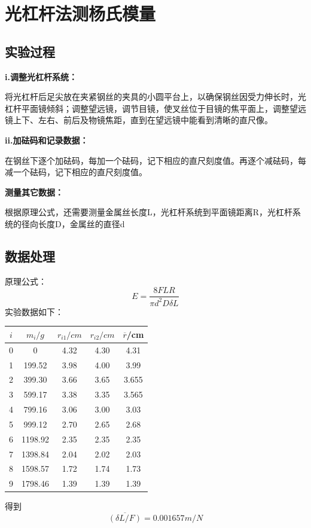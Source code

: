 \documentclass[a4paper, 10pt]{article}
\begin{document}
\section{光杠杆法测杨氏模量}
\subsection{实验过程}

\noindent \textbf{i.‌调整光杠杆系统‌：}

\noindent 将光杠杆后足尖放在夹紧钢丝的夹具的小圆平台上，以确保钢丝因受力伸长时，光杠杆平面镜倾斜；调整望远镜，调节目镜，使叉丝位于目镜的焦平面上，调整望远镜上下、左右、前后及物镜焦距，直到在望远镜中能看到清晰的直尺像。

\vspace{10pt}
\noindent \textbf{ii.‌加砝码和记录数据‌：}

\noindent 在钢丝下逐个加砝码，每加一个砝码，记下相应的直尺刻度值。再逐个减砝码，每减一个砝码，记下相应的直尺刻度值。

\vspace{10pt}
\noindent \textbf{测量其它数据：}

\noindent 根据原理公式，还需要测量金属丝长度L，光杠杆系统到平面镜距离R，光杠杆系统的径向长度D，金属丝的直径d

\subsection{数据处理}
\noindent 原理公式：
$$E=\frac{8FLR}{\pi d^2D \delta L}$$
实验数据如下：
\begin{center}
    \begin{tabular}{|c|c|c|c|c|}
      \hline
      $i $& $m_i/g$ & $r_{i1}/cm$ & $r_{i2}/cm$ & $\overline{r}$/cm\\
      \hline
      0 &0 &4.32&4.30&4.31\\
      \hline
      1 & 199.52&3.98&4.00&3.99\\
      \hline
      2 &399.30 &3.66&3.65&3.655\\
      \hline
      3 & 599.17&3.38&3.35&3.565\\
      \hline
      4 &799.16 &3.06&3.00&3.03\\
      \hline
      5 &999.12 &2.70&2.65&2.68\\
      \hline
      6 &1198.92 &2.35&2.35&2.35\\
      \hline
      7 & 1398.84&2.04&2.02&2.03\\
      \hline
      8 &1598.57 &1.72&1.74&1.73\\
      \hline
      9 & 1798.46&1.39&1.39&1.39\\
      \hline
    \end{tabular}
  \end{center}
  \noindent 得到
  $$\overline{(\delta L/F)}=0.001657m/N$$
\end{document}
